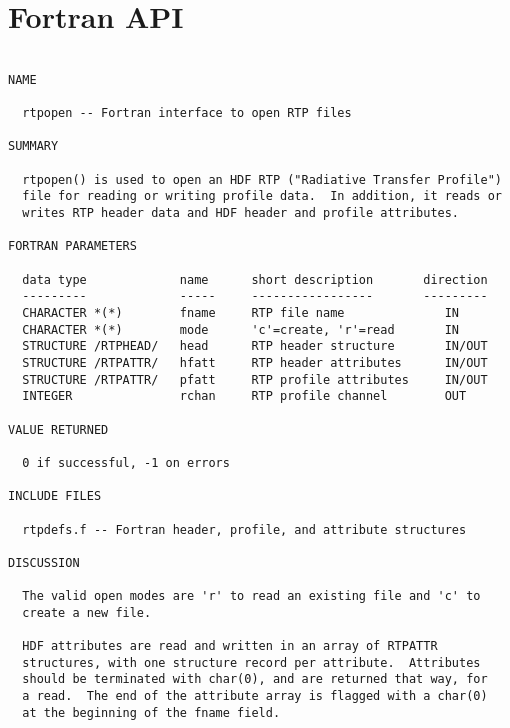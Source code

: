 \documentclass[11pt]{article}
\begin{document}
\section{Fortran API}
{\footnotesize
\begin{verbatim}

NAME

  rtpopen -- Fortran interface to open RTP files

SUMMARY

  rtpopen() is used to open an HDF RTP ("Radiative Transfer Profile")
  file for reading or writing profile data.  In addition, it reads or
  writes RTP header data and HDF header and profile attributes. 

FORTRAN PARAMETERS

  data type             name      short description       direction
  ---------             -----     -----------------       ---------
  CHARACTER *(*)        fname     RTP file name              IN
  CHARACTER *(*)        mode      'c'=create, 'r'=read       IN
  STRUCTURE /RTPHEAD/   head      RTP header structure       IN/OUT
  STRUCTURE /RTPATTR/   hfatt     RTP header attributes      IN/OUT
  STRUCTURE /RTPATTR/   pfatt     RTP profile attributes     IN/OUT
  INTEGER               rchan     RTP profile channel        OUT

VALUE RETURNED

  0 if successful, -1 on errors

INCLUDE FILES

  rtpdefs.f -- Fortran header, profile, and attribute structures

DISCUSSION

  The valid open modes are 'r' to read an existing file and 'c' to
  create a new file.

  HDF attributes are read and written in an array of RTPATTR
  structures, with one structure record per attribute.  Attributes
  should be terminated with char(0), and are returned that way, for
  a read.  The end of the attribute array is flagged with a char(0)
  at the beginning of the fname field.

\end{verbatim}
}
\end{document}
